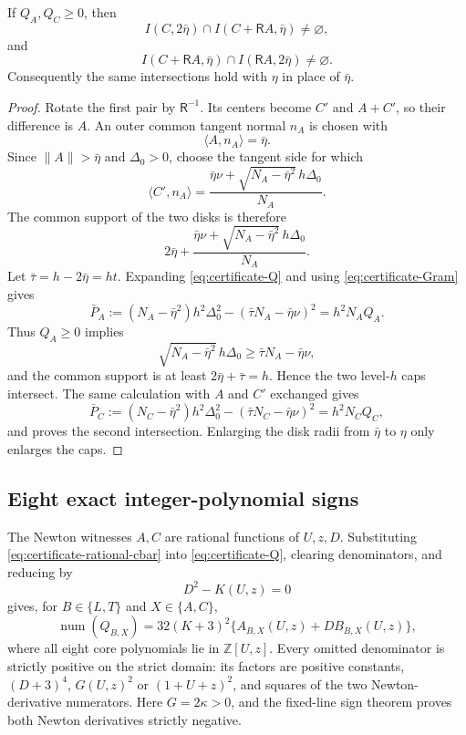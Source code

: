 \begin{lemma}
\label{lem:paper-residual-to-overlap}
If $Q_A,Q_C\ge0$, then
\[
 I(C,2\bar\eta)\cap I(C+\mathsf RA,\bar\eta)\ne\varnothing,
\]
and
\[
 I(C+\mathsf RA,\bar\eta)\cap I(\mathsf RA,2\bar\eta)\ne\varnothing.
\]
Consequently the same intersections hold with $\eta$ in place of
$\bar\eta$.
\end{lemma}

\begin{proof}
Rotate the first pair by $\mathsf R^{-1}$.  Its centers become $C'$ and
$A+C'$, so their difference is $A$.  An outer common tangent normal $n_A$ is
chosen with
\[
 \langle A,n_A\rangle=\bar\eta.
\]
Since $\lVert A\rVert>\bar\eta$ and $\Delta_0>0$, choose the tangent side for
which
\[
 \langle C',n_A\rangle
 =\frac{\bar\eta\nu+\sqrt{N_A-\bar\eta^2}\,h\Delta_0}{N_A}.
\]
The common support of the two disks is therefore
\[
 2\bar\eta+
 \frac{\bar\eta\nu+\sqrt{N_A-\bar\eta^2}\,h\Delta_0}{N_A}.
\]
Let $\bar\tau=h-2\bar\eta=ht$.  Expanding
\eqref{eq:certificate-Q} and using \eqref{eq:certificate-Gram} gives
\begin{equation}
 \bar P_A
 :=(N_A-\bar\eta^2)h^2\Delta_0^2
   -(\bar\tau N_A-\bar\eta\nu)^2
 =h^2N_AQ_A.
 \label{eq:certificate-PA}
\end{equation}
Thus $Q_A\ge0$ implies
\[
 \sqrt{N_A-\bar\eta^2}\,h\Delta_0
 \ge\bar\tau N_A-\bar\eta\nu,
\]
and the common support is at least
$2\bar\eta+\bar\tau=h$.  Hence the two level-$h$ caps intersect.
The same calculation with $A$ and $C'$ exchanged gives
\begin{equation}
 \bar P_C
 :=(N_C-\bar\eta^2)h^2\Delta_0^2
   -(\bar\tau N_C-\bar\eta\nu)^2
 =h^2N_CQ_C,
 \label{eq:certificate-PC}
\end{equation}
and proves the second intersection.  Enlarging the disk radii from
$\bar\eta$ to $\eta$ only enlarges the caps.
\end{proof}

\subsection{Eight exact integer-polynomial signs}

The Newton witnesses $A,C$ are rational functions of $U,z,D$.  Substituting
\eqref{eq:certificate-rational-cbar} into \eqref{eq:certificate-Q}, clearing
denominators, and reducing by
\[
 D^2-K(U,z)=0
\]
gives, for $B\in\{L,T\}$ and $X\in\{A,C\}$,
\begin{equation}
 \operatorname{num}(Q_{B,X})
 =32(K+3)^2
 \{A_{B,X}(U,z)+D B_{B,X}(U,z)\},
 \label{eq:certificate-core-reduction}
\end{equation}
where all eight core polynomials lie in $\mathbb Z[U,z]$.
Every omitted denominator is strictly positive on the strict domain: its
factors are positive constants, $(D+3)^4$, $G(U,z)^2$ or
$(1+U+z)^2$, and squares of the two Newton-derivative numerators.  Here
$G=2\kappa>0$, and the fixed-line sign theorem proves both Newton derivatives
strictly negative.

